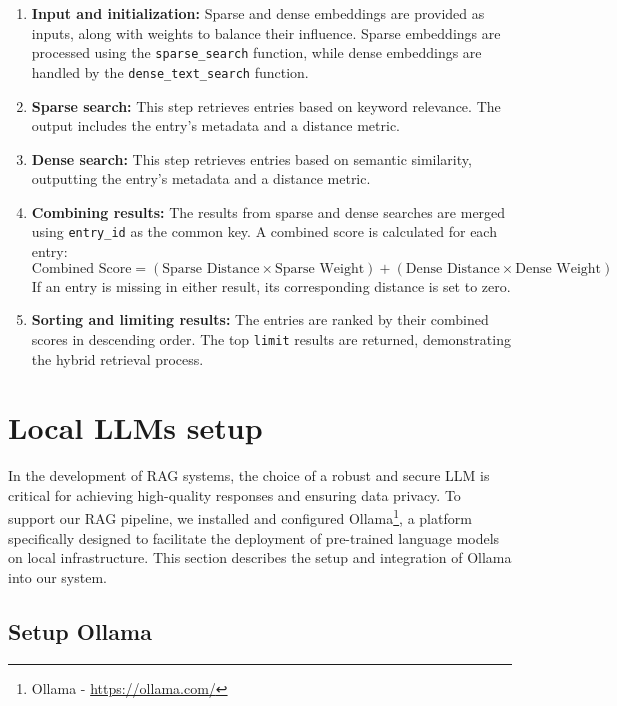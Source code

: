 \begin{enumerate}
	\item \textbf{Input and initialization:}
	Sparse and dense embeddings are provided as inputs, along with weights to balance their influence. Sparse embeddings are processed using the \texttt{sparse\_search} function, while dense embeddings are handled by the \texttt{dense\_text\_search} function.
	
	\item \textbf{Sparse search:}
	This step retrieves entries based on keyword relevance. The output includes the entry's metadata and a distance metric.
	
	\item \textbf{Dense search:}
	This step retrieves entries based on semantic similarity, outputting the entry's metadata and a distance metric.
	
	\item \textbf{Combining results:}
	The results from sparse and dense searches are merged using \texttt{entry\_id} as the common key. A combined score is calculated for each entry:
	\[
	\text{Combined Score} = (\text{Sparse Distance} \times \text{Sparse Weight}) + (\text{Dense Distance} \times \text{Dense Weight})
	\]
	If an entry is missing in either result, its corresponding distance is set to zero.
	
	\item \textbf{Sorting and limiting results:}
	The entries are ranked by their combined scores in descending order. The top \texttt{limit} results are returned, demonstrating the hybrid retrieval process.
\end{enumerate}

\section{Local LLMs setup}

In the development of RAG systems, the choice of a robust and secure LLM is critical for achieving high-quality responses and ensuring data privacy. To support our RAG pipeline, we installed and configured Ollama\footnote{Ollama - \url{https://ollama.com/}}, a platform specifically designed to facilitate the deployment of pre-trained language models on local infrastructure. This section describes the setup and integration of Ollama into our system.

\subsection{Setup Ollama}

